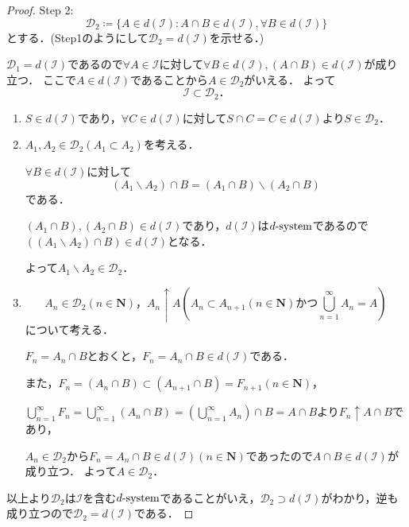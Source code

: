 \documentclass{jsarticle}
\begin{document}
\begin{proof}
Step 2:
    \begin{equation}
        \mathcal{D}_2\coloneqq \{A\in d(\mathcal{I}):A\cap B\in d(\mathcal{I}),\forall B\in d(\mathcal{I})\} \nonumber    
    \end{equation}
    とする．(Step1のようにして$\mathcal{D}_2=d(\mathcal{I})$を示せる．)
    
    $\mathcal{D}_1=d(\mathcal{I})$であるので$\forall A \in \mathcal{I}$に対して$\forall B \in d(\mathcal{I}),(A\cap B)\in d(\mathcal{I})$が成り立つ．
    ここで$A \in d(\mathcal{I})$であることから$A\in\mathcal{D}_2$がいえる．
    よって
    \begin{equation}
        \mathcal{I}\subset\mathcal{D}_2． \nonumber
    \end{equation}

    \begin{enumerate}
        \item $S\in d(\mathcal{I})$であり，$\forall C\in d(\mathcal{I})$に対して$S\cap C=C\in d(\mathcal{I})$より$S\in\mathcal{D}_2$．
        \item $A_1,A_2\in\mathcal{D}_2(A_1\subset A_2)$を考える．\par
            $\forall B\in d(\mathcal{I})$に対して
            \begin{equation}
                (A_1\backslash A_2)\cap B=(A_1\cap B)\backslash (A_2\cap B) \nonumber
            \end{equation}
            である．\par
            $(A_1\cap B),(A_2\cap B)\in d(\mathcal{I})$であり，$d(\mathcal{I})$は$d{\rm \text{-}system}$であるので$\left((A_1\backslash A_2)\cap B\right)\in d(\mathcal{I})$となる．\par
            よって$A_1\backslash A_2\in\mathcal{D}_2$．
        \item \begin{equation}
                A_n\in\mathcal{D}_2(n\in\mathbf{N})，A_n\uparrow A \left(A_n\subset A_{n+1}(n\in\mathbf{N}) かつ \bigcup_{n=1}^{\infty}A_n=A\right) \nonumber
            \end{equation}
            について考える．\par
            $F_n=A_n\cap B$とおくと，$F_n=A_n\cap B\in d(\mathcal{I})$である．\par
            また，$F_n=(A_n\cap B)\subset (A_{n+1}\cap B)=F_{n+1} (n\in\mathbf{N})$，\par
            $\bigcup_{n=1}^{\infty}F_n=\bigcup_{n=1}^{\infty}(A_n\cap B)=\left(\bigcup_{n=1}^{\infty}A_n\right)\cap B=A\cap B$より$F_n\uparrow A\cap B$であり，\par
            $A_n\in\mathcal{D}_2$から$F_n=A_n\cap B\in d(\mathcal{I}) (n\in\mathbf{N})$であったので$A\cap B\in d(\mathcal{I})$が成り立つ．
            よって$A\in \mathcal{D}_2$．
    \end{enumerate}        
    以上より$\mathcal{D}_2$は$\mathcal{I}$を含む$d{\rm \text{-}system}$であることがいえ，$\mathcal{D}_2\supset d(\mathcal{I})$がわかり，逆も成り立つので$\mathcal{D}_2=d(\mathcal{I})$である．
    

\end{proof}
\end{document}

